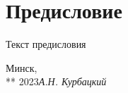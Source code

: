 
\chapter*{\LARGE Предисловие}
\label{chap_preface}

Текст предисловия
 
\vspace{\baselineskip}
\begin{flushright}\noindent
Минск,\hfill {\it ~~~}\\
** 2023\hfill {\it А.Н. Курбацкий}\\
\end{flushright}


